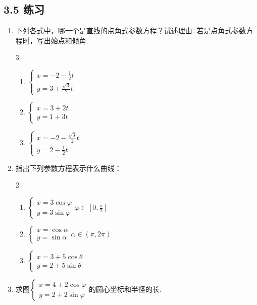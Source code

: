 \subsection*{3.5 练习}
\begin{enumerate}
    \item 下列各式中，哪一个是直线的点角式参数方程？试述理由. 若是点角式参数方程时，写出始点和倾角.
\begin{multicols}{3}
\begin{enumerate}[(1)]
    \item $\begin{cases}
        x= -2-\frac{1}{2}t  \\[1.5ex]
        y= 3+\frac{\sqrt{3}}{2}t 
    \end{cases}$
    \item $\begin{cases}
        x= 3+2t  \\
        y=  1+3t
    \end{cases}$
    \item $\begin{cases}
        x= -2-\frac{\sqrt{3}}{2}t  \\[1.5ex]
        y= 2-\frac{1}{2}t 
    \end{cases}$
\end{enumerate}
\end{multicols}
    \item 指出下列参数方程表示什么曲线：
\begin{multicols}{2}
\begin{enumerate}[(1)]
    \item $\begin{cases}
        x= 3\cos\varphi  \\
        y=  3\sin\varphi
    \end{cases}\varphi\in\left[0,\frac{\pi}{2}\right]$
    \item $\begin{cases}
        x= \cos\alpha  \\
        y= \sin\alpha 
    \end{cases}\alpha\in (\pi,2\pi)$
    \item $\begin{cases}
        x= 3+5\cos\theta  \\
        y=  2+5\sin\theta
    \end{cases}$
\end{enumerate}
\end{multicols}

\item 求图$\begin{cases}
    x=4+2\cos\varphi\\ 
    y=2+2\sin\varphi
\end{cases}$的圆心坐标和半径的长.
\end{enumerate}

